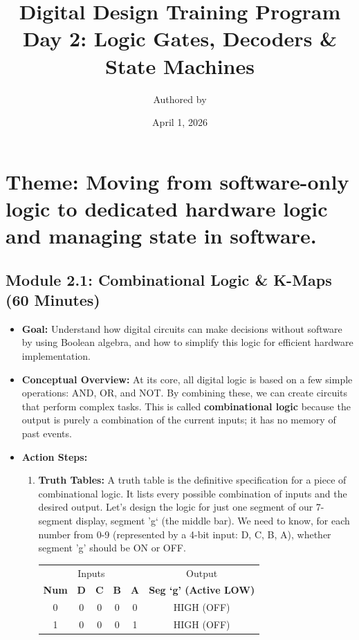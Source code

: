 \documentclass[11pt,a4paper]{article}
\title{Digital Design Training Program \\ \large Day 2: Logic Gates, Decoders \& State Machines}
\author{Authored by }
\date{April 1, 2026}
\begin{document}
\maketitle

\section*{Theme: Moving from software-only logic to dedicated hardware logic and managing state in software.}

\subsection*{Module 2.1: Combinational Logic \& K-Maps (60 Minutes)}

\begin{itemize}
    \item \textbf{Goal:} Understand how digital circuits can make decisions without software by using Boolean algebra, and how to simplify this logic for efficient hardware implementation.
    \item \textbf{Conceptual Overview:} At its core, all digital logic is based on a few simple operations: AND, OR, and NOT. By combining these, we can create circuits that perform complex tasks. This is called \textbf{combinational logic} because the output is purely a combination of the current inputs; it has no memory of past events.
    \item \textbf{Action Steps:}
    \begin{enumerate}[label=\arabic*.]
        \item \textbf{Truth Tables:} A truth table is the definitive specification for a piece of combinational logic. It lists every possible combination of inputs and the desired output. Let's design the logic for just one segment of our 7-segment display, segment 'g` (the middle bar). We need to know, for each number from 0-9 (represented by a 4-bit input: D, C, B, A), whether segment 'g' should be ON or OFF.
        \begin{center}
        \begin{tabular}{ccccc|c}
        \toprule
        \multicolumn{5}{c|}{Inputs} & Output \\
        \textbf{Num} & \textbf{D} & \textbf{C} & \textbf{B} & \textbf{A} & \textbf{Seg `g' (Active LOW)} \\
        \midrule
        0 & 0 & 0 & 0 & 0 & HIGH (OFF) \\
        1 & 0 & 0 & 0 & 1 & HIGH (OFF) \\

\end{tabular}
\end{center}
\end{enumerate}
\end{itemize}
\end{document}
